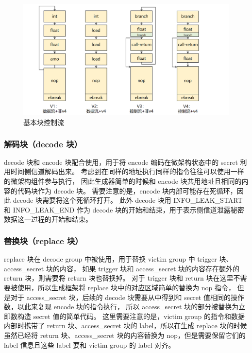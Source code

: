 \begin{figure}[!h]
    \centering
    \includegraphics[width=\linewidth]{figure/paper/encode-consist.png}
    \caption{基本块控制流}
    \label{paper:encode-consist}
\end{figure}

\subsubsection{解码块（decode 块）}
decode 块和 encode 块配合使用，用于将 encode 编码在微架构状态中的 secret 利用时间侧信道解码出来。
考虑到在同样的地址执行同样的指令往往可以使用一样的微架构组件参与执行，
因此生成器简单的时候和 encode 块共用地址且相同的内容的代码块作为 decode 块。
需要注意的是，encode 块内部可能存在死循环，因此 decode 块需要将这个死循环打开。
此外 decode 块用 INFO\_LEAK\_START 和 INFO\_LEAK\_END 作为
decode 块的开始和结束，用于表示侧信道泄露秘密数据这一过程的开始和结束。\par

\subsubsection{替换块（replace 块）}
replace 块在 decode group 中被使用，用于替换 victim group 中 trigger 块、access\_secret 块的内容，
如果 trigger 块和 access\_secret 块的内容存在额外的 return 块，则需要将 return 块也替换掉。
对于 trigger 块和 return 块在这里不需要被使用，所以生成框架将 replace 块中的对应区域简单的替换为 nop 指令，
但是对于 access\_secret 块，后续的 decode 块需要从中得到和 secret 值相同的操作数，以此来复现 encode 块的指令执行，
所以 access\_secret 块的部分被替换为立即数构造 secret 值的简单代码。
这里需要注意的是，victim group 的指令和数据内部时携带了 return 块、access\_secret 块的 label，所以在生成 replace 块的时候
虽然已经将 return 块、access\_secret 块的内容替换为 nop，但是需要保留它们的 label 信息且这些 label 要和 victim group 的 label 对齐。\par

